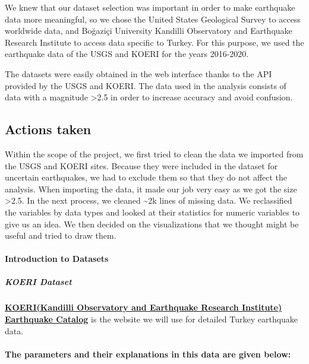 \documentclass[
]{article}
\begin{document}
We knew that our dataset selection was important in order to make
earthquake data more meaningful, so we chose the United States
Geological Survey to access worldwide data, and Boğaziçi University
Kandilli Observatory and Earthquake Research Institute to access data
specific to Turkey. For this purpose, we used the earthquake data of the
USGS and KOERI for the years 2016-2020.

The datasets were easily obtained in the web interface thanks to the API
provided by the USGS and KOERI. The data used in the analysis consists
of data with a magnitude \textgreater2.5 in order to increase accuracy
and avoid confusion.

\hypertarget{actions-taken}{%
\subsection{Actions taken}\label{actions-taken}}

Within the scope of the project, we first tried to clean the data we
imported from the USGS and KOERI sites. Because they were included in
the dataset for uncertain earthquakes, we had to exclude them so that
they do not affect the analysis. When importing the data, it made our
job very easy as we got the size \textgreater2.5. In the next process,
we cleaned \textasciitilde2k lines of missing data. We reclassified the
variables by data types and looked at their statistics for numeric
variables to give us an idea. We then decided on the visualizations that
we thought might be useful and tried to draw them.

\hypertarget{introduction-to-datasets}{%
\paragraph{Introduction to Datasets}\label{introduction-to-datasets}}

\hypertarget{koeri-dataset}{%
\subparagraph{KOERI Dataset}\label{koeri-dataset}}

\href{http://www.koeri.boun.edu.tr/sismo/2/earthquake-catalog/}{\textbf{KOERI(Kandilli
Observatory and Earthquake Research Institute) Earthquake Catalog}} is
the website we will use for detailed Turkey earthquake data.

\hypertarget{the-parameters-and-their-explanations-in-this-data-are-given-below}{%
\paragraph{The parameters and their explanations in this data are given
below:}\label{the-parameters-and-their-explanations-in-this-data-are-given-below}}
\end{document}
